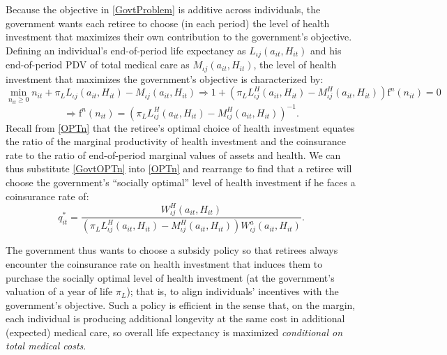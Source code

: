 \documentclass[12pt,pdftex,letterpaper]{article}
\newcommand{\Type}{\iota}
\newcommand{\PostHealth}{H}
\newcommand{\PostValue}{W}
\newcommand{\Invst}{n}
\newcommand{\Assets}{a}
\newcommand{\Copay}{q}
\newcommand{\Age}{j}
\newcommand{\HealthProdFunc}{\text{f}}
\begin{document}
Because the objective in \eqref{GovtProblem} is additive across individuals, the government wants each retiree to choose (in each period) the level of health investment that maximizes their own contribution to the government's objective.  Defining an individual's end-of-period life expectancy as $L_{\Type \Age}(\Assets_{it},\PostHealth_{it})$ and his end-of-period PDV of total medical care as $M_{\Type \Age}(\Assets_{it},\PostHealth_{it})$, the level of health investment that maximizes the government's objective is characterized by:
\begin{equation*}
\min_{\Invst_{it} \geq 0} \Invst_{it} + \pi_L L_{\Type \Age}(\Assets_{it},\PostHealth_{it}) - M_{\Type \Age}(\Assets_{it},\PostHealth_{it}) \Longrightarrow 1 + \left( \pi_L L^\PostHealth_{\Type \Age}(\Assets_{it},\PostHealth_{it}) - M^\PostHealth_{\Type \Age}(\Assets_{it},\PostHealth_{it}) \right) \HealthProdFunc^\Invst(\Invst_{it}) = 0
\end{equation*}
\begin{equation}\label{GovtOPTn}
\Longrightarrow \HealthProdFunc^\Invst(\Invst_{it}) = \left( \pi_L L^\PostHealth_{\Type \Age}(\Assets_{it},\PostHealth_{it}) - M^\PostHealth_{\Type \Age}(\Assets_{it},\PostHealth_{it}) \right)^{-1}.
\end{equation}
Recall from \eqref{OPTn} that the retiree's optimal choice of health investment equates the ratio of the marginal productivity of health investment and the coinsurance rate to the ratio of end-of-period marginal values of assets and health.  We can thus substitute \eqref{GovtOPTn} into \eqref{OPTn} and rearrange to find that a retiree will choose the government's ``socially optimal'' level of health investment if he faces a coinsurance rate of:
\begin{equation}\label{CopaySocOpt}
\Copay_{it}^* = \frac{\PostValue^\PostHealth_{\Type \Age}(\Assets_{it},\PostHealth_{it})}{\left( \pi_L L^\PostHealth_{\Type \Age}(\Assets_{it},\PostHealth_{it}) - M^\PostHealth_{\Type \Age}(\Assets_{it},\PostHealth_{it}) \right) \PostValue^\Assets_{\Type \Age}(\Assets_{it},\PostHealth_{it})}.
\end{equation}

The government thus wants to choose a subsidy policy so that retirees always encounter the coinsurance rate on health investment that induces them to purchase the socially optimal level of health investment (at the government's valuation of a year of life $\pi_L$); that is, to align individuals' incentives with the government's objective.  Such a policy is efficient in the sense that, on the margin, each individual is producing additional longevity at the same cost in additional (expected) medical care, so overall life expectancy is maximized \textit{conditional on total medical costs}.
\end{document}
